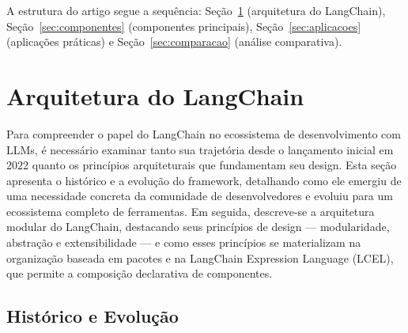 \documentclass[12pt]{article}
\begin{document}
A estrutura do artigo segue a sequência: Seção~\ref{sec:arquitetura} (arquitetura do LangChain), Seção~\ref{sec:componentes} (componentes principais), Seção~\ref{sec:aplicacoes} (aplicações práticas) e Seção~\ref{sec:comparacao} (análise comparativa).


\section{Arquitetura do LangChain}
\label{sec:arquitetura}


Para compreender o papel do LangChain no ecossistema de desenvolvimento com LLMs, é necessário examinar tanto sua trajetória desde o lançamento inicial em 2022 quanto os princípios arquiteturais que fundamentam seu design. Esta seção apresenta o histórico e a evolução do framework, detalhando como ele emergiu de uma necessidade concreta da comunidade de desenvolvedores e evoluiu para um ecossistema completo de ferramentas. Em seguida, descreve-se a arquitetura modular do LangChain, destacando seus princípios de design — modularidade, abstração e extensibilidade — e como esses princípios se materializam na organização baseada em pacotes e na LangChain Expression Language (LCEL), que permite a composição declarativa de componentes.

\subsection{Histórico e Evolução}
\label{subsec:historico}

\end{document}
